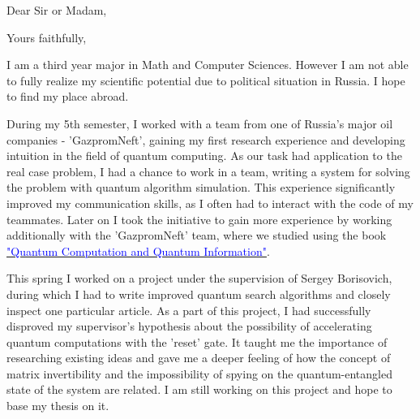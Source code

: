 \documentclass[11pt,a4paper,sans]{moderncv}        %
\begin{document}
	\clearpage
	\opening{Dear Sir or Madam,}
	\closing{Yours faithfully,}
	\makelettertitle
	
	I am a third year major in Math and Computer Sciences. However I am not able to fully realize my scientific potential due to political situation in Russia. I hope to find my place abroad. 
	
	During my 5th semester, I worked with a team from one of Russia's major oil companies - 'GazpromNeft', gaining my first research experience and developing intuition in the field of quantum computing. As our task had application to the real case problem, I had a chance to work in a team, writing a system for solving the problem with quantum algorithm simulation. This experience significantly improved my communication skills, as I often had to interact with the code of my teammates. Later on I took the initiative to gain more experience by working additionally with the 'GazpromNeft' team, where we studied using the book \href{https://www.cambridge.org/ru/academic/subjects/physics/quantum-physics-quantum-information-and-quantum-computation/quantum-computation-and-quantum-information-10th-anniversary-edition?format=HB&isbn=9781107002173}{\textcolor{blue}{"Quantum Computation and Quantum Information"}}.
	
	This spring I worked on a project under the supervision of Sergey Borisovich, during which I had to write improved quantum search algorithms and closely inspect one particular article. As a part of this project, I had successfully disproved my supervisor's hypothesis about the possibility of accelerating quantum computations with the 'reset' gate. It taught me the importance of researching existing ideas and gave me a deeper feeling of how the concept of matrix invertibility and the impossibility of spying on the quantum-entangled state of the system are related. I am still working on this project and hope to base my thesis on it.
	
\end{document}
